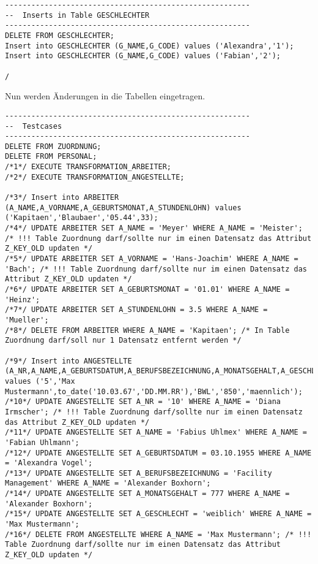 \documentclass{scrartcl}
\begin{document}
\begin{lstlisting}
--------------------------------------------------------
--  Inserts in Table GESCHLECHTER
--------------------------------------------------------
DELETE FROM GESCHLECHTER;
Insert into GESCHLECHTER (G_NAME,G_CODE) values ('Alexandra','1');
Insert into GESCHLECHTER (G_NAME,G_CODE) values ('Fabian','2');

/
\end{lstlisting}


Nun werden Änderungen in die Tabellen eingetragen.
\begin{lstlisting}
--------------------------------------------------------
--  Testcases
--------------------------------------------------------
DELETE FROM ZUORDNUNG;
DELETE FROM PERSONAL;
/*1*/ EXECUTE TRANSFORMATION_ARBEITER;
/*2*/ EXECUTE TRANSFORMATION_ANGESTELLTE;

/*3*/ Insert into ARBEITER (A_NAME,A_VORNAME,A_GEBURTSMONAT,A_STUNDENLOHN) values ('Kapitaen','Blaubaer','05.44',33); 
/*4*/ UPDATE ARBEITER SET A_NAME = 'Meyer' WHERE A_NAME = 'Meister'; /* !!! Table Zuordnung darf/sollte nur im einen Datensatz das Attribut Z_KEY_OLD updaten */
/*5*/ UPDATE ARBEITER SET A_VORNAME = 'Hans-Joachim' WHERE A_NAME = 'Bach'; /* !!! Table Zuordnung darf/sollte nur im einen Datensatz das Attribut Z_KEY_OLD updaten */
/*6*/ UPDATE ARBEITER SET A_GEBURTSMONAT = '01.01' WHERE A_NAME = 'Heinz';
/*7*/ UPDATE ARBEITER SET A_STUNDENLOHN = 3.5 WHERE A_NAME = 'Mueller';
/*8*/ DELETE FROM ARBEITER WHERE A_NAME = 'Kapitaen'; /* In Table Zuordnung darf/soll nur 1 Datensatz entfernt werden */

/*9*/ Insert into ANGESTELLTE (A_NR,A_NAME,A_GEBURTSDATUM,A_BERUFSBEZEICHNUNG,A_MONATSGEHALT,A_GESCHLECHT) values ('5','Max Mustermann',to_date('10.03.67','DD.MM.RR'),'BWL','850','maennlich');
/*10*/ UPDATE ANGESTELLTE SET A_NR = '10' WHERE A_NAME = 'Diana Irmscher'; /* !!! Table Zuordnung darf/sollte nur im einen Datensatz das Attribut Z_KEY_OLD updaten */
/*11*/ UPDATE ANGESTELLTE SET A_NAME = 'Fabius Uhlmex' WHERE A_NAME = 'Fabian Uhlmann';
/*12*/ UPDATE ANGESTELLTE SET A_GEBURTSDATUM = 03.10.1955 WHERE A_NAME = 'Alexandra Vogel';
/*13*/ UPDATE ANGESTELLTE SET A_BERUFSBEZEICHNUNG = 'Facility Management' WHERE A_NAME = 'Alexander Boxhorn';
/*14*/ UPDATE ANGESTELLTE SET A_MONATSGEHALT = 777 WHERE A_NAME = 'Alexander Boxhorn';
/*15*/ UPDATE ANGESTELLTE SET A_GESCHLECHT = 'weiblich' WHERE A_NAME = 'Max Mustermann';
/*16*/ DELETE FROM ANGESTELLTE WHERE A_NAME = 'Max Mustermann'; /* !!! Table Zuordnung darf/sollte nur im einen Datensatz das Attribut Z_KEY_OLD updaten */

\end{lstlisting}
\end{document}
